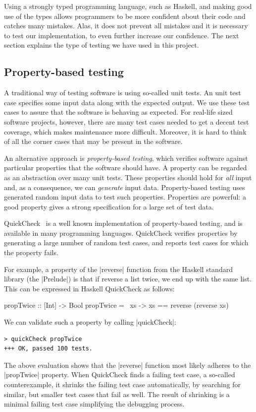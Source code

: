 \documentclass{article}
\begin{document}
Using a strongly typed programming language, such as Haskell, and making good
use of the types allows programmers to be more confident about their code and
catches many mistakes. Alas, it does not prevent all mistakes and it is
necessary to test our implementation, to even further increase our confidence.
The next section explains the type of testing we have used in this project.

\subsection{Property-based testing}

A traditional way of testing software is using so-called unit tests. An unit
test case specifies some input data along with the expected output. We use these
test cases to assure that the software is behaving as expected. For real-life
sized software projects, however, there are many test cases needed to get a
decent test coverage, which makes maintenance more difficult. Moreover, it is
hard to think of all the corner cases that may be present in the software.

An alternative approach is \emph{property-based testing}, which verifies
software against particular properties that the software should have. A property
can be regarded as an abstraction over many unit tests. These properties should
hold for \emph{all} input and, as a consequence, we can \emph{generate} input
data. Property-based testing uses generated random input data to test such
properties. Properties are powerful: a good property gives a strong
specification for a large set of test data. 

QuickCheck~\cite{QuickCheck} is a well known implementation of property-based
testing, and is available in many programming languages.  QuickCheck verifies
properties by generating a large number of random test cases, and reports test
cases for which the property fails. 

For example, a property of the |reverse| function from the Haskell standard
library (the |Prelude|) is that if reverse a list twice, we end up with the same
list. This can be expressed in Haskell QuickCheck as follows:
\begin{haskellcode}
propTwice :: [Int] -> Bool
propTwice = \ xs -> xs == reverse (reverse xs)
\end{haskellcode}
We can validate such a property by calling |quickCheck|:
\begin{verbatim}
> quickCheck propTwice
+++ OK, passed 100 tests.
\end{verbatim}
The above evaluation shows that the |reverse| function most likely adheres to
the |propTwice| property. When QuickCheck finds a failing test case, a so-called
counterexample, it shrinks the failing test case automatically, by searching for
similar, but smaller test cases that fail as well. The result of shrinking is a
minimal failing test case simplifying the debugging process. 
\end{document}

